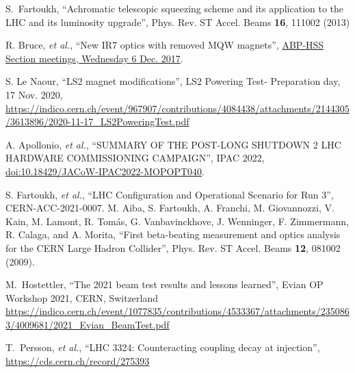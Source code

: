 \documentclass[a4paper]{cernatsnote}
\begin{document}
\begin{thebibliography}{99}   %

S.~Fartoukh, ``Achromatic telescopic squeezing scheme and its application to the LHC and its luminosity upgrade'', Phys. Rev. ST Accel. Beams {\bf16}, 111002 (2013)

 R. Bruce, {\it et al.}, ``New IR7 optics with removed
MQW magnets'',  \href{https://indico.cern.ch/event/681507/contributions/2814548/attachments/1570845/2478033/2017.12.06--HSS_meeting_MQW_removal.pdf}{ABP-HSS Section meetings,
Wednesday 6 Dec. 2017}.


 S. Le Naour, ``LS2 magnet modifications'', LS2 Powering Test- Preparation day, 17 Nov. 2020,
\url{https://indico.cern.ch/event/967907/contributions/4084438/attachments/2144305/3613896/2020-11-17_LS2PoweringTest.pdf}

 A. Apollonio, {\it et al.}, ``SUMMARY OF THE POST-LONG SHUTDOWN 2
LHC HARDWARE COMMISSIONING CAMPAIGN'', IPAC 2022,  \url{doi:10.18429/JACoW-IPAC2022-MOPOPT040}.

 S. Fartoukh, {\it et al.}, 
	``LHC Configuration and Operational Scenario for Run 3'', CERN-ACC-2021-0007.
 M. Aiba, S. Fartoukh, A. Franchi, M. Giovannozzi, V. Kain, M. Lamont, R. Tom\'as, G. Vanbavinckhove, J. Wenninger, F. Zimmermann, R. Calaga, and A. Morita, ``First beta-beating measurement and optics analysis for the CERN Large Hadron Collider'', Phys. Rev. ST Accel. Beams {\bf12}, 081002 (2009).

  M.~Hostettler, ``The 2021 beam test results and lessons learned'', Evian OP Workshop 2021, CERN, Switzerland
\url{https://indico.cern.ch/event/1077835/contributions/4533367/attachments/2350863/4009681/2021_Evian_BeamTest.pdf}

 T.~Persson, {\it et al.},  ``LHC 3324: Counteracting coupling decay at injection'', \url{https://cds.cern.ch/record/275393}

\end{thebibliography}
\end{document}
